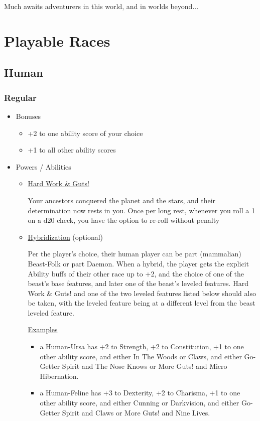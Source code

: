 \documentclass[12pt, landscape]{article}
\begin{document}
\begin{FlushLeft}
\begin{multicols}{2}
			Much awaits adventurers in this world, and in worlds beyond...
			\vfill
			\pagebreak

			\section{Playable Races}
			\subsection{Human}
			\subsubsection{Regular}
			\begin{itemize}
				\item Bonuses
				\begin{itemize}
					\item +2 to one ability score of your choice
					\item +1 to all other ability scores
				\end{itemize}
				\item Powers  / Abilities
				\begin{itemize}
					\item \underline{Hard Work \& Guts!}

					Your ancestors conquered the planet and the stars, and their determination now rests in you. Once per long rest, whenever you roll a 1 on a d20 check, you have the option to re-roll without penalty

					\item \underline{Hybridization} (optional)

					Per the player’s choice, their human player can be part (mammalian) Beast-Folk or part Daemon.
					When a hybrid, the player gets the explicit Ability buffs of their other race up to +2, and the choice of one of the beast’s base features, and later one of the beast’s leveled features.
					Hard Work \& Guts! and one of the two leveled features listed below should also be taken, with the leveled feature being at a different level from the beast leveled feature.

					\underline{Examples}
					\begin{itemize}
						\item a Human-Ursa has +2 to Strength, +2 to Constitution, +1 to one other ability score, and either In The Woods or Claws, and either Go-Getter Spirit and The Nose Knows or More Guts! and Micro Hibernation.
						\item a Human-Feline has +3 to Dexterity, +2 to Charisma, +1 to one other ability score, and either Cunning or Darkvision, and either Go-Getter Spirit and Claws or More Guts! and Nine Lives.
					\end{itemize}


\end{itemize}
\end{itemize}
\end{multicols}
\end{FlushLeft}
\end{document}
